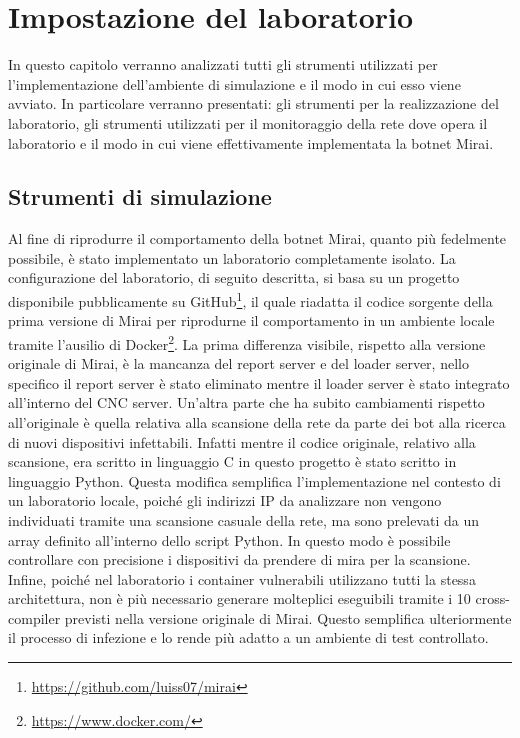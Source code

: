 \chapter{Impostazione del laboratorio}\label{imp_laboratorio}
In questo capitolo verranno analizzati tutti gli strumenti utilizzati per l'implementazione dell'ambiente di simulazione e il modo in cui esso viene avviato. In particolare verranno presentati: gli strumenti per la realizzazione del laboratorio, gli strumenti utilizzati per il monitoraggio della rete dove opera il laboratorio e il modo in cui viene effettivamente implementata la botnet Mirai.
\section{Strumenti di simulazione}\label{strumenti_di_simulazione}
Al fine di riprodurre il comportamento della botnet Mirai, quanto più fedelmente possibile, è stato implementato un laboratorio completamente isolato. 
La configurazione del laboratorio, di seguito descritta, si basa su un progetto disponibile pubblicamente su GitHub\footnote{\url{https://github.com/luiss07/mirai}}, il quale riadatta il codice sorgente della prima versione di Mirai per riprodurne il comportamento in un ambiente locale tramite l'ausilio di Docker\footnote{\url{https://www.docker.com/}}. La prima differenza visibile, rispetto alla versione originale di Mirai, è la mancanza del report server e del loader server, nello specifico il report server è stato eliminato mentre il loader server è stato integrato all'interno del CNC server. Un'altra parte che ha subito cambiamenti rispetto all'originale è quella relativa alla scansione della rete da parte dei bot alla ricerca di nuovi dispositivi infettabili. Infatti mentre il codice originale, relativo alla scansione, era scritto in linguaggio C in questo progetto è stato scritto in linguaggio Python. Questa modifica semplifica l’implementazione nel contesto di un laboratorio locale, poiché gli indirizzi IP da analizzare non vengono individuati tramite una scansione casuale della rete, ma sono prelevati da un array definito all’interno dello script Python. In questo modo è possibile controllare con precisione i dispositivi da prendere di mira per la scansione. Infine, poiché nel laboratorio i container vulnerabili utilizzano tutti la stessa architettura, non è più necessario generare molteplici eseguibili tramite i 10 cross-compiler previsti nella versione originale di Mirai. Questo semplifica ulteriormente il processo di infezione e lo rende più adatto a un ambiente di test controllato.

